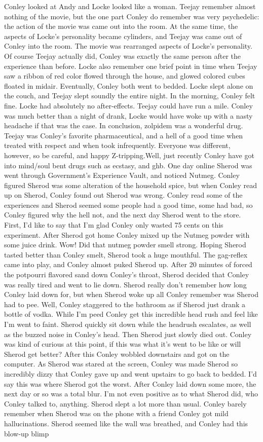 \documentclass[12pt]{book}
\begin{document}
Conley looked at Andy and Locke looked like a woman. Teejay remember almost nothing of the movie, but the one part Conley do remember was very psychedelic: the action of the movie was came out into the room. At the same time, the aspects of Locke's personality became cylinders, and Teejay was came out of Conley into the room. The movie was rearranged aspects of Locke's personality. Of course Teejay actually did, Conley was exactly the same person after the experience than before. Locke also remember one brief point in time when Teejay saw a ribbon of red color flowed through the house, and glowed colored cubes floated in midair. Eventually, Conley both went to bedded. Locke slept alone on the couch, and Teejay slept soundly the entire night. In the morning, Conley felt fine. Locke had absolutely no after-effects. Teejay could have run a mile. Conley was much better than a night of drank, Locke would have woke up with a nasty headache if that was the case. In conclusion, zolpidem was a wonderful drug. Teejay was Conley's favorite pharmaceutical, and a hell of a good time when treated with respect and when took infrequently. Everyone was different, however, so be careful, and happy Z-tripping.Well, just recently Conley have got into mind/soul bent drugs such as ecstasy, and ghb. One day online Sherod was went through Government's Experience Vault, and noticed Nutmeg. Conley figured Sherod was some alteration of the household spice, but when Conley read up on Sherod, Conley found out Sherod was wrong. Conley read some of the experiences and Sherod seemed some people had a good time, some had bad, so Conley figured why the hell not, and the next day Sherod went to the store. First, I'd like to say that I'm glad Conley only wasted 75 cents on this experiment. After Sherod got home Conley mixed up the Nutmeg powder with some juice drink. Wow! Did that nutmeg powder smell strong. Hoping Sherod tasted better than Conley smelt, Sherod took a huge mouthful. The gag-reflex came into play, and Conley almost puked Sherod up. After 20 minutes of forced the potpourri flavored sand down Conley's throat, Sherod decided that Conley was really tired and went to lie down. Sherod really don't remember how long Conley laid down for, but when Sherod woke up all Conley remember was Sherod had to pee. Well, Conley staggered to the bathroom as if Sherod just drank a bottle of vodka. While I'm peed Conley get this incredible head rush and feel like I'm went to faint. Sherod quickly sit down while the headrush escalates, as well as the buzzed noise in Conley's head. Then Sherod just slowly died out. Conley was kind of curious at this point, if this was what it's went to be like or will Sherod get better? After this Conley wobbled downstairs and got on the computer. As Sherod was stared at the screen, Conley was made Sherod so incredibly dizzy that Conley gave up and went upstairs to go back to bedded. I'd say this was where Sherod got the worst. After Conley laid down some more, the next day or so was a total blur. I'm not even positive as to what Sherod did, who Conley talked to, anything. Sherod slept a lot more than usual. Conley barely remember when Sherod was on the phone with a friend Conley got mild hallucinations. Sherod seemed like the wall was breathed, and Conley had this blow-up blimp 
\end{document}
